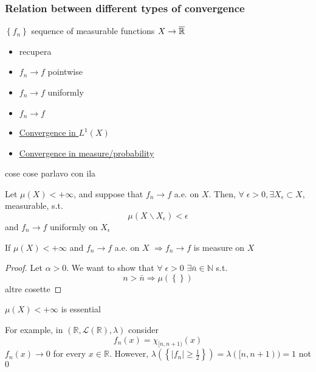 \subsubsection*{Relation between different types of convergence}
\(\left\lbrace f_n \right\rbrace\) sequence of measurable functions \(X \to \overline{\mathbb{R}}\)
\begin{itemize}
    \item recupera
    \item \(f_n \to f\) pointwise
    \item \(f_n \to f\) uniformly
    \item \(f_n \to f\)
    \item \underline{Convergence in \(L^1(X)\)}
    \item \underline{Convergence in measure/probability}
\end{itemize}
cose cose parlavo con ila 
\begin{theorem}[Egorov]
    Let \(\mu(X) < +\infty\), and suppose that \(f_n \to f\) a.e. on \(X\). Then, \(\forall \; \epsilon > 0, \exists X_{\epsilon} \subset X\), measurable, s.t. 
    \[
        \mu(X \backslash X_{\epsilon}) < \epsilon
    \]
    and \(f_n \to f\) uniformly on \(X_{\epsilon}\)
\end{theorem}
\begin{theorem}
    If \(\mu(X) < +\infty\) and \(f_n \to f\) a.e. on \(X\) \(\Longrightarrow f_n \to f\) is measure on \(X\)
\end{theorem}
\begin{proof}
    Let \(\alpha > 0\). We want to show that \(\forall \; \epsilon > 0\) \(\exists \bar{n} \in \mathbb{N}\) s.t. 
    \[
        n > \bar{n} \Longrightarrow \mu(\left\lbrace \right\rbrace)
    \]
    altre cosette 
\end{proof}
\begin{remark}
    \(\mu(X) < +\infty\) is essential
\end{remark}
For example, in \((\mathbb{R}, \mathcal{L}(\mathbb{R}), \lambda)\) consider
\[
    f_n (x) = \chi_{[n, n+1)}(x)
\]
\(f_n(x) \to 0\) for every \(x \in \mathbb{R}\). However, \(\lambda(\left\lbrace \vert f_n \vert \geq \frac{1}{2}\right\rbrace) = \lambda([n, n+1)) = 1\) not \(0\)
